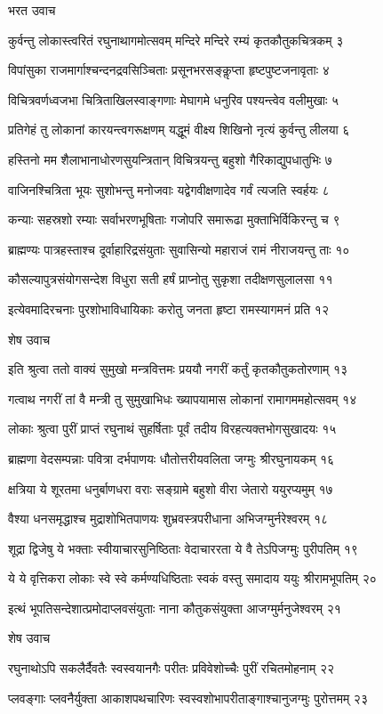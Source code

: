 भरत उवाच

कुर्वन्तु लोकास्त्वरितं रघुनाथागमोत्सवम्
मन्दिरे मन्दिरे रम्यं कृतकौतुकचित्रकम् ३

विपांसुका राजमार्गाश्चन्दनद्रवसिञ्चिताः
प्रसूनभरसङ्कॢप्ता हृष्टपुष्टजनावृताः ४

विचित्रवर्णध्वजभा चित्रिताखिलस्वाङ्गणाः
मेघागमे धनुरिव पश्यन्त्वेव वलीमुखाः ५

प्रतिगेहं तु लोकानां कारयन्त्वगरूक्षणम्
यद्धूमं वीक्ष्य शिखिनो नृत्यं कुर्वन्तु लीलया ६

हस्तिनो मम शैलाभानाधोरणसुयन्त्रितान्
विचित्रयन्तु बहुशो गैरिकाद्युपधातुभिः ७

वाजिनश्चित्रिता भूयः सुशोभन्तु मनोजवाः
यद्वेगवीक्षणादेव गर्वं त्यजति स्वर्हयः ८

कन्याः सहस्रशो रम्याः सर्वाभरणभूषिताः
गजोपरि समारूढा मुक्ताभिर्विकिरन्तु च ९

ब्राह्मण्यः पात्रहस्ताश्च दूर्वाहारिद्रसंयुताः
सुवासिन्यो महाराजं रामं नीराजयन्तु ताः १०

कौसल्यापुत्रसंयोगसन्देश विधुरा सती
हर्षं प्राप्नोतु सुकृशा तदीक्षणसुलालसा ११

इत्येवमादिरचनाः पुरशोभाविधायिकाः
करोतु जनता हृष्टा रामस्यागमनं प्रति १२

शेष उवाच

इति श्रुत्वा ततो वाक्यं सुमुखो मन्त्रवित्तमः
प्रययौ नगरीं कर्तुं कृतकौतुकतोरणाम् १३

गत्वाथ नगरीं तां वै मन्त्री तु सुमुखाभिधः
ख्यापयामास लोकानां रामागममहोत्सवम् १४

लोकाः श्रुत्वा पुरीं प्राप्तं रघुनाथं सुहर्षिताः
पूर्वं तदीय विरहत्यक्तभोगसुखादयः १५

ब्राह्मणा वेदसम्पन्नाः पवित्रा दर्भपाणयः
धौतोत्तरीयवलिता जग्मुः श्रीरघुनायकम् १६

क्षत्रिया ये शूरतमा धनुर्बाणधरा वराः
सङ्ग्रामे बहुशो वीरा जेतारो ययुरप्यमुम् १७

वैश्या धनसमृद्धाश्च मुद्राशोभितपाणयः
शुभ्रवस्त्रपरीधाना अभिजग्मुर्नरेश्वरम् १८

शूद्रा द्विजेषु ये भक्ताः स्वीयाचारसुनिष्ठिताः
वेदाचाररता ये वै तेऽपिजग्मुः पुरीपतिम् १९

ये ये वृत्तिकरा लोकाः स्वे स्वे कर्मण्यधिष्ठिताः
स्वकं वस्तु समादाय ययुः श्रीरामभूपतिम् २०

इत्थं भूपतिसन्देशात्प्रमोदाप्लवसंयुताः
नाना कौतुकसंयुक्ता आजग्मुर्मनुजेश्वरम् २१

शेष उवाच

रघुनाथोऽपि सकलैर्दैवतैः स्वस्वयानगैः
परीतः प्रविवेशोच्चैः पुरीं रचितमोहनाम् २२

प्लवङ्गाः प्लवनैर्युक्ता आकाशपथचारिणः
स्वस्वशोभापरीताङ्गाश्चानुजग्मुः पुरोत्तमम् २३

